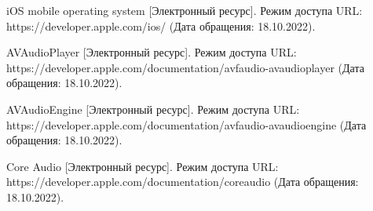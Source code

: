 \begin{thebibliography}{}
	iOS mobile operating system [Электронный ресурс].
	Режим доступа URL: https://developer.apple.com/ios/ (Дата обращения: 18.10.2022).
	
	AVAudioPlayer [Электронный ресурс].
	Режим доступа URL: https://developer.apple.com/documentation/avfaudio-avaudioplayer (Дата обращения: 18.10.2022).
	
	AVAudioEngine [Электронный ресурс].
	Режим доступа URL: https://developer.apple.com/documentation/avfaudio-avaudioengine (Дата обращения: 18.10.2022).
	
	Core Audio [Электронный ресурс].
	Режим доступа URL: https://developer.apple.com/documentation/coreaudio (Дата обращения: 18.10.2022).

\end{thebibliography}
\endgroup

\pagebreak